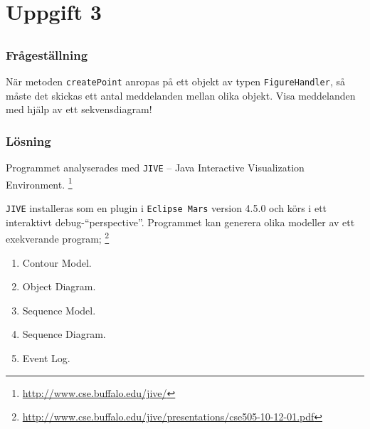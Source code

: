 %
%

\section{Uppgift 3}\label{sec:uppg3}

\subsection{}\label{sec:uppg3a}
\subsubsection*{Frågeställning}
När metoden \texttt{createPoint} anropas på ett objekt av typen
\texttt{FigureHandler}, så måste det skickas ett antal meddelanden mellan olika
objekt. Visa meddelanden med hjälp av ett sekvensdiagram!

\subsubsection*{Lösning}
Programmet analyserades med \texttt{JIVE} -- Java Interactive
Visualization Environment. \footnote{\url{http://www.cse.buffalo.edu/jive/}}

\texttt{JIVE} installeras som en plugin i \texttt{Eclipse Mars} version 4.5.0
och körs i ett interaktivt debug-``perspective''. Programmet kan generera olika
modeller av ett exekverande program;
\footnote{\url{http://www.cse.buffalo.edu/jive/presentations/cse505-10-12-01.pdf}}

\begin{enumerate}
\item Contour Model.
\item Object Diagram.
\item Sequence Model.
\item Sequence Diagram.
\item Event Log.
\end{enumerate}

